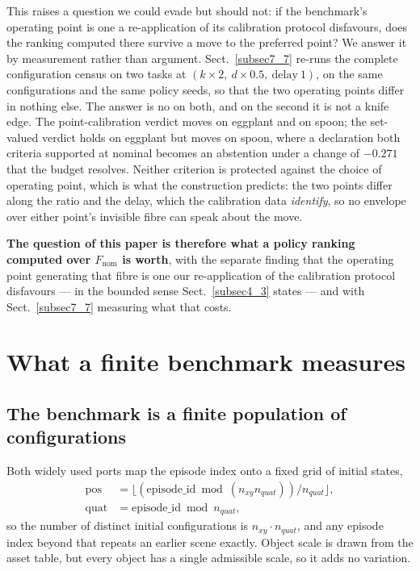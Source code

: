 \documentclass[pdflatex,iicol,sn-apa]{sn-jnl}
\theoremstyle{remark}
\begin{document}
This raises a question we could evade but should not: if the benchmark's operating point is one a
re-application of its calibration protocol disfavours, does the ranking computed there survive a
move to the preferred point? We answer it by measurement rather than argument.
Sect.~\ref{subsec7_7} re-runs the complete configuration census on two tasks at
$(k{\times}2,\ d{\times}0.5,\ \text{delay}\ 1)$, on the same configurations and the same policy
seeds, so that the two operating points differ in nothing else.
The answer is no on both, and on the second it is not a knife edge. The point-calibration verdict
moves on eggplant and on spoon; the set-valued verdict holds on eggplant but moves on spoon, where a
declaration both criteria supported at nominal becomes an abstention under a change of $-0.271$ that
the budget resolves. Neither criterion is protected against the choice of operating point, which is
what the construction predicts: the two points differ along the ratio and the delay, which the
calibration data \emph{identify}, so no envelope over either point's invisible fibre can speak about
the move.

\textbf{The question of this paper is therefore what a policy ranking computed over
$F_{\mathrm{nom}}$ is worth}, with the separate finding that the operating point generating that
fibre is one our re-application of the calibration protocol disfavours --- in the bounded sense
Sect.~\ref{subsec4_3} states --- and with Sect.~\ref{subsec7_7} measuring what that costs.

\section{What a finite benchmark measures}\label{sec5}

\subsection{The benchmark is a finite population of configurations}\label{subsec5_1}

Both widely used ports map the episode index onto a fixed grid of initial states,
\begin{align}
\mathrm{pos}  &= \big\lfloor (\mathrm{episode\_id} \bmod (n_{xy} n_{quat})) / n_{quat} \big\rfloor, \\
\mathrm{quat} &= \mathrm{episode\_id} \bmod n_{quat},
\end{align}
so the number of distinct initial configurations is $n_{xy} \cdot n_{quat}$, and any episode index
beyond that repeats an earlier scene exactly. Object scale is drawn from the asset table, but every
object has a single admissible scale, so it adds no variation.
\end{document}
